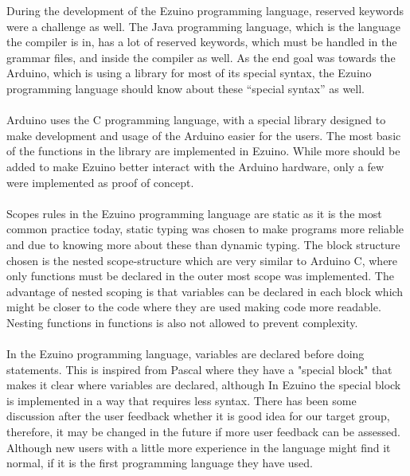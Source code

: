 During the development of the Ezuino programming language, reserved keywords were a challenge as well. The Java programming language, which is the language the compiler is in, has a lot of reserved keywords, which must be handled in the grammar files, and inside the compiler as well. As the end goal was towards the Arduino, which is using a library for most of its special syntax, the Ezuino programming language should know about these “special syntax” as well.
\\\\
Arduino uses the C programming language, with a special library designed to make development and usage of the Arduino easier for the users. 
The most basic of the functions in the library are implemented in Ezuino. While more should be added to make Ezuino better interact with the Arduino hardware, only a few were implemented as proof of concept.
\\\\
Scopes rules in the Ezuino programming language are static as it is the most common practice today, static typing was chosen to make programs more reliable and due to knowing more about these than dynamic typing. The block structure chosen is the nested scope-structure which are very similar to Arduino C, where only functions must be declared in the outer most scope was implemented. The advantage of nested scoping is that variables can be declared in each block which might be closer to the code where they are used making code more readable. Nesting functions in functions is also not allowed to prevent complexity.
\\\\
In the Ezuino programming language, variables are declared before doing statements. This is inspired from Pascal where they have a "special block" that makes it clear where variables are declared, although In Ezuino the special block is implemented in a way that requires less syntax. There has been some discussion after the user feedback whether it is good idea for our target group, therefore, it may be changed in the future if more user feedback can be assessed. Although new users with a little more experience in the language might find it normal, if it is the first programming language they have used.
 


